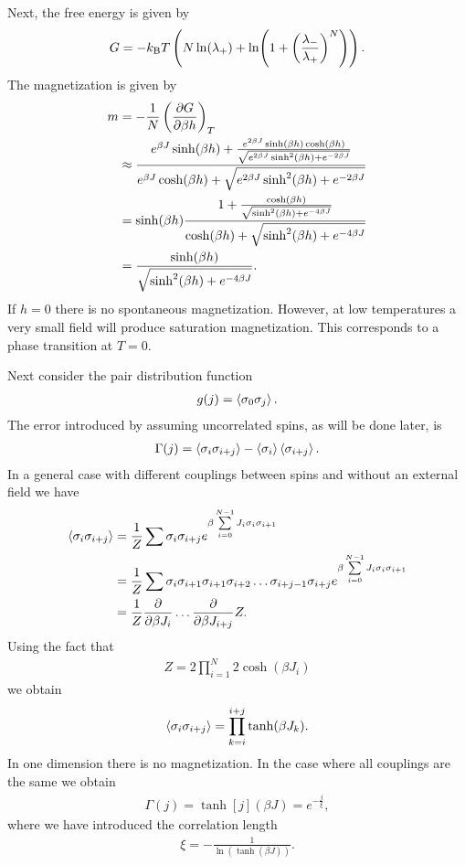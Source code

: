 Next, the free energy is given by
\begin{align*}
	G = -k_{\text{B}} T\left(N\ln(\lambda_{+}) + \ln(1 + \left(\frac{\lambda_{-}}{\lambda_{+}}\right)^{N})\right).
\end{align*}
The magnetization is given by
\begin{align*}
	m &= -\frac{1}{N}\left(\pdv{G}{\beta h}\right)_{T} \\
	  &\approx \frac{e^{\beta J}\sinh(\beta h) + \frac{e^{2\beta J}\sinh(\beta h)\cosh(\beta h)}{\sqrt{e^{2\beta J}\sinh[2](\beta h) + e^{-2\beta J}}}}{e^{\beta J}\cosh(\beta h) + \sqrt{e^{2\beta J}\sinh[2](\beta h) + e^{-2\beta J}}} \\
	  &= \sinh(\beta h)\frac{1 + \frac{\cosh(\beta h)}{\sqrt{\sinh[2](\beta h) + e^{-4\beta J}}}}{\cosh(\beta h) + \sqrt{\sinh[2](\beta h) + e^{-4\beta J}}} \\
	  &= \frac{\sinh(\beta h)}{\sqrt{\sinh[2](\beta h) + e^{-4\beta J}}}.
\end{align*}
If $h = 0$ there is no spontaneous magnetization. However, at low temperatures a very small field will produce saturation magnetization. This corresponds to a phase transition at $T = 0$.

Next consider the pair distribution function
\begin{align*}
	g(j) = \expval{\sigma_{0}\sigma_{j}}.
\end{align*}
The error introduced by assuming uncorrelated spins, as will be done later, is
\begin{align*}
	\Gamma(j) = \expval{\sigma_{i}\sigma_{i + j}} - \expval{\sigma_{i}}\expval{\sigma_{i + j}}.
\end{align*}
In a general case with different couplings between spins and without an external field we have
\begin{align*}
	\expval{\sigma_{i}\sigma_{i + j}} &= \frac{1}{Z}\sum\sigma_{i}\sigma_{i + j}e^{\beta \sum\limits_{i = 0}^{N - 1}J_{i}\sigma_{i}\sigma_{i + 1}} \\
	                                  &= \frac{1}{Z}\sum\sigma_{i}\sigma_{i + 1}\sigma_{i + 1}\sigma_{i + 2}\dots\sigma_{i + j - 1}\sigma_{i + j}e^{\beta \sum\limits_{i = 0}^{N - 1}J_{i}\sigma_{i}\sigma_{i + 1}} \\
	                                  &= \frac{1}{Z}\pdv{\beta J_{i}}\dots\pdv{\beta J_{i + j}}Z.
\end{align*}
Using the fact that
\begin{align*}
	Z = 2\prod\limits_{i = 1}^{N}2\cosh(\beta J_{i})
\end{align*}
we obtain
\begin{align*}
	\expval{\sigma_{i}\sigma_{i + j}} = \prod\limits_{k = i}^{i + j}\tanh(\beta J_{k}).
\end{align*}
In one dimension there is no magnetization. In the case where all couplings are the same we obtain
\begin{align*}
	\Gamma(j) = \tanh[j](\beta J) = e^{-\frac{j}{\xi}},
\end{align*}
where we have introduced the correlation length
\begin{align*}
	\xi = -\frac{1}{\ln(\tanh(\beta J))}.
\end{align*}